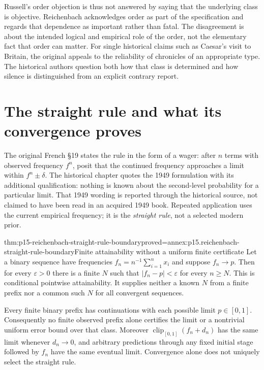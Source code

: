 Russell's order objection is thus not answered by saying that the
underlying class is objective. Reichenbach acknowledges order as part
of the specification and regards that dependence as important rather
than fatal. The disagreement is about the intended logical and empirical
role of the order, not the elementary fact that order can matter.
For single historical claims such as Caesar's visit to Britain, the
original appeals to the reliability of chronicles of an appropriate
type. The historical authors question both how that class is determined
and how silence is distinguished from an explicit contrary report.

\section{The straight rule and what its convergence proves}
\label{sec:p15-reichenbach-straight-rule}

The original French §19 states the rule in the form of a wager:
after \(n\) terms with observed frequency \(f^n\), posit that
the continued frequency approaches a limit within \(f^n\pm\delta\).
The historical chapter quotes the 1949 formulation with its additional
qualification: nothing is known about the second-level probability for
a particular limit. That 1949 wording is reported through the
historical source, not claimed to have been read in an acquired 1949
book. Repeated application uses the current empirical frequency;
it is the \emph{straight rule}, not a selected modern prior.

\begin{hbtheorem}{thm:p15-reichenbach-straight-rule-boundary}{proved=annex:p15.reichenbach-straight-rule-boundary}{Finite attainability without a uniform finite certificate}
Let a binary sequence have frequencies
\(f_n=n^{-1}\sum_{i=1}^n x_i\) and suppose \(f_n\to p\).
Then for every \(\varepsilon>0\) there is a finite \(N\)
such that \(|f_n-p|<\varepsilon\) for every \(n\geq N\).
This is conditional pointwise attainability. It supplies neither a
known \(N\) from a finite prefix nor a common such \(N\) for
all convergent sequences.

Every finite binary prefix has continuations with each possible limit
\(p\in[0,1]\). Consequently no finite observed prefix alone
certifies the limit or a nontrivial uniform error bound over that class.
Moreover \(\operatorname{clip}_{[0,1]}(f_n+d_n)\) has the same
limit whenever \(d_n\to0\), and arbitrary predictions through
any fixed initial stage followed by \(f_n\) have the same eventual
limit. Convergence alone does not uniquely select the straight rule.
\end{hbtheorem}

